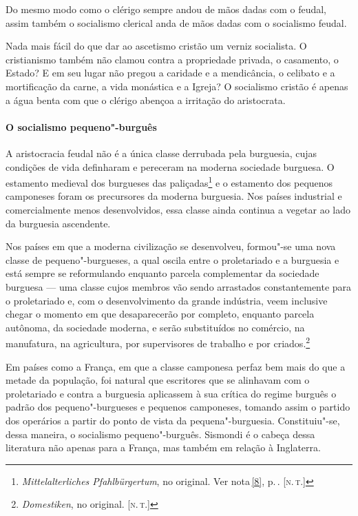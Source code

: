 Do mesmo modo como o clérigo sempre andou de mãos dadas com o feudal,
assim também o socialismo clerical anda de mãos dadas com o socialismo
feudal.

Nada mais fácil do que dar ao ascetismo cristão um verniz socialista. O
cristianismo também não clamou contra a propriedade privada, o
casamento, o Estado? E em seu lugar não pregou a caridade e a
mendicância, o celibato e a mortificação da carne, a vida monástica e a
Igreja? O socialismo cristão é apenas a água benta com que o clérigo
abençoa a irritação do aristocrata.

\paragraph{O socialismo pequeno"-burguês}

A aristocracia feudal não é a única classe derrubada pela
burguesia, cujas condições de vida definharam e pereceram na moderna
sociedade burguesa. O estamento medieval dos burgueses das
paliçadas\footnote{\textit{Mittelalterliches Pfahlbürgertum},
no original. Ver nota\,\ref{8}, p.\,\pageref{8}. [\textsc{n.\,t.}]} e o estamento dos pequenos camponeses
foram os precursores da moderna burguesia. Nos países industrial e
comercialmente menos desenvolvidos, essa classe ainda continua a
vegetar ao lado da burguesia ascendente.

Nos países em que a moderna civilização se desenvolveu,
formou"-se uma nova classe de pequeno"-burgueses, a qual oscila entre
o proletariado e a burguesia e está sempre se reformulando enquanto
parcela complementar da sociedade burguesa  ---  uma classe cujos membros
vão sendo arrastados constantemente para o proletariado e, com o
desenvolvimento da grande indústria, veem inclusive chegar o momento em
que desaparecerão por completo, enquanto parcela autônoma, da sociedade
moderna, e serão substituídos no comércio, na manufatura, na
agricultura, por supervisores de trabalho e por
criados.\footnote{\textit{Domestiken}, no original. [\textsc{n.\,t.}]}

Em países como a França, em que a classe camponesa perfaz bem mais do
que a metade da população, foi natural que escritores que se alinhavam
com o proletariado e contra a burguesia aplicassem à sua crítica do
regime burguês o padrão dos pequeno"-burgueses e pequenos camponeses,
tomando assim o partido dos operários a partir do ponto de vista da
pequena"-burguesia. Constituiu"-se, dessa maneira, o socialismo
pequeno"-burguês. Sismondi é o cabeça dessa literatura não apenas para
a França, mas também em relação à Inglaterra.


